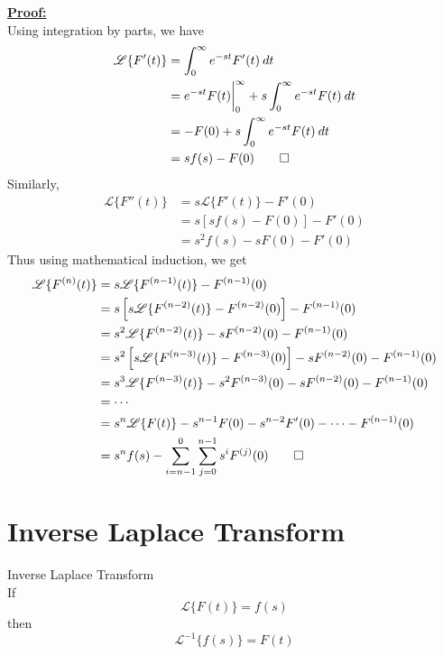 \documentclass[12pt]{article}
\newcommand{\Lap}{\mathscr{L}}
\begin{document}
\underline{\textbf{Proof: }} \\
Using integration by parts, we have
\begin{align*}
    \Lap \{ F'(t) \} &= \int_{0}^{\infty} {e^{-st}F'(t)} \: d{t} \\
    &= e^{-st}F(t)\bigg|_{0}^{\infty} + s \int_{0}^{\infty} {e^{-st}F(t)} \: d{t}  \\
    &= - F(0) + s \int_{0}^{\infty} {e^{-st}F(t)} \: d{t} \\
    &= sf(s) - F(0) \qed
\end{align*}
Similarly,
\begin{align*}
    \Lap \{ F''(t) \} &= s \Lap \{ F'(t) \} - F'(0) \\
    &= s \left[ sf(s) - F(0) \right] - F'(0) \\
    &= s^2f(s) - sF(0) - F'(0)
\end{align*}
Thus using mathematical induction, we get
\begin{align*}
    \Lap \{ F^{(n)}(t) \} &= s \Lap \{ F^{(n-1)}(t) \} - F^{(n-1)}(0) \\
    &= s \left[ s \Lap \{ F^{(n-2)}(t) \} - F^{(n-2)}(0) \right] - F^{(n-1)}(0) \\
    &= s^2 \Lap \{ F^{(n-2)}(t) \} - sF^{(n-2)}(0) - F^{(n-1)}(0) \\
    &= s^2 \left[ s \Lap \{ F^{(n-3)}(t) \} - F^{(n-3)}(0) \right] - sF^{(n-2)}(0) - F^{(n-1)}(0) \\
    &= s^3 \Lap \{ F^{(n-3)}(t) \} - s^2F^{(n-3)}(0) - sF^{(n-2)}(0) - F^{(n-1)}(0) \\
    &= \cdots \\
    &= s^n \Lap \{ F(t) \} - s^{n-1}F(0) - s^{n-2}F'(0) - \cdots - F^{(n-1)}(0) \\
    &= s^nf(s) - \sum_{i=n-1}^{0}\sum_{j=0}^{n-1} s^i F^{(j)}(0) \qed
\end{align*}

\newpage
\section{Inverse Laplace Transform}

\begin{theorem}{Inverse Laplace Transform}{}
    \\If \[
        \Lap \{ F(t) \} = f(s)
    \] then \[
        \Lap^{-1} \{ f(s) \} = F(t)
    \]
\end{theorem}
\end{document}
